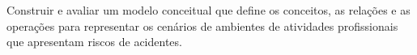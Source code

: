 Construir e avaliar um modelo conceitual que define os conceitos, as relações e as operações para representar os cenários de ambientes de atividades profissionais que apresentam riscos de acidentes.